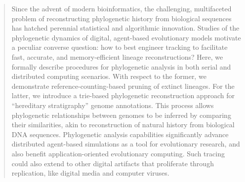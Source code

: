 \begin{abstract}


Since the advent of modern bioinformatics, the challenging, multifaceted problem of reconstructing phylogenetic history from biological sequences has hatched perennial statistical and algorithmic innovation.
Studies of the phylogenetic dynamics of digital, agent-based evolutionary models motivate a peculiar converse question: how to best engineer tracking to facilitate fast, accurate, and memory-efficient lineage reconstructions?
Here, we formally describe procedures for phylogenetic analysis in both serial and distributed computing scenarios.
With respect to the former, we demonstrate reference-counting-based pruning of extinct lineages.
For the latter, we introduce a trie-based phylogenetic reconstruction approach for ``hereditary stratigraphy'' genome annotations.
This process allows phylogenetic relationships between genomes to be inferred by comparing their similarities, akin to reconstruction of natural history from biological DNA sequences.
Phylogenetic analysis capabilities significantly advance distributed agent-based simulations as a tool for evolutionary research, and also benefit application-oriented evolutionary computing.
Such tracing could also extend to other digital artifacts that proliferate through replication, like digital media and computer viruses.



\end{abstract}
